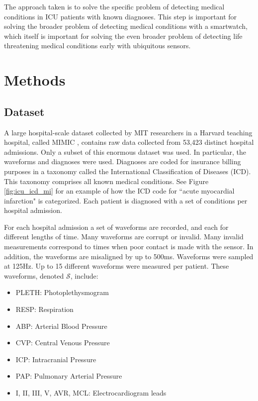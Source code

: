 The approach taken is to solve the specific problem of detecting medical conditions in ICU patients with known diagnoses.  This step is important for solving the broader problem of detecting medical conditions with a smartwatch, which itself is important for solving the even broader problem of detecting life threatening medical conditions early with ubiquitous sensors.

\section{Methods}

\subsection{Dataset}

A large hospital-scale dataset collected by MIT researchers in a Harvard teaching hospital, called MIMIC \cite{johnson2016mimic}, contains raw data collected from 53,423 distinct hospital admissions.  Only a subset of this enormous dataset was used.  In particular, the waveforms and diagnoses were used.  Diagnoses are coded for insurance billing purposes in a taxonomy called the International Classification of Diseases (ICD).  This taxonomy comprises all known medical conditions. See Figure \ref{fig:icu_icd_mi} for an example of how the ICD code for ``acute myocardial infarction" is categorized.  Each patient is diagnosed with a set of conditions per hospital admission.

For each hospital admission a set of waveforms are recorded, and each for different lengths of time.  Many waveforms are corrupt or invalid.  Many invalid measurements correspond to times when poor contact is made with the sensor.  In addition, the waveforms are misaligned by up to 500ms.  Waveforms were sampled at 125Hz.  Up to 15 different waveforms were measured per patient.  These waveforms, denoted $\mathcal{S}$, include:

\begin{itemize}
    \item PLETH: Photoplethysmogram
    \item RESP: Respiration
    \item ABP: Arterial Blood Pressure
    \item CVP: Central Venous Pressure
    \item ICP: Intracranial Pressure
    \item PAP: Pulmonary Arterial Pressure
    \item I, II, III, V, AVR, MCL: Electrocardiogram leads
\end{itemize}


